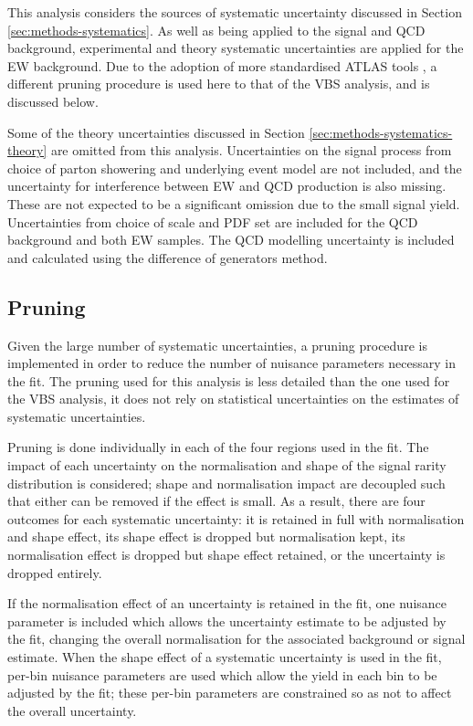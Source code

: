 
This analysis considers the sources of systematic uncertainty discussed in
Section \ref{sec:methods-systematics}. As well as being applied to the signal
and \ac{QCD} \Zy background, experimental and theory systematic
uncertainties are applied for the \ac{EW} \Zyjj background. Due to the adoption
of more standardised \ac{ATLAS} tools \cite{trexfitter}, a different pruning
procedure is used here to that of the \ac{VBS} analysis, and is discussed below.

Some of the theory uncertainties discussed in Section
\ref{sec:methods-systematics-theory} are omitted from this analysis.
Uncertainties on the signal process from choice of parton showering and
underlying event model are not included, and the uncertainty for interference
between \ac{EW} and \ac{QCD} \Zyjj production is also missing. These are not
expected to be a significant omission due to the small signal yield.
Uncertainties from choice of scale and \ac{PDF} set are included for the \ac{QCD}
\Zy background and both \ac{EW} \Zyjj samples. The QCD modelling uncertainty is
included and calculated using the difference of generators method.


\subsection{Pruning}
Given the large number of systematic uncertainties, a pruning procedure is
implemented in order to reduce the number of nuisance parameters necessary in
the fit. The pruning used for this analysis is less detailed than the one used
for the \ac{VBS} \Zy analysis, it does not rely on statistical uncertainties on
the estimates of systematic uncertainties.

Pruning is done individually in each of the four regions used in the fit.
The impact of each uncertainty on the normalisation and shape of the signal
rarity distribution is considered; shape and normalisation impact are decoupled
such that either can be removed if the effect is small. As a result, there are
four outcomes for each systematic uncertainty: it is retained in full with
normalisation and shape effect, its shape effect is dropped but normalisation
kept, its normalisation effect is dropped but shape effect retained, or the
uncertainty is dropped entirely.

If the normalisation effect of an uncertainty is retained in the fit, one
nuisance parameter is included which allows the uncertainty estimate to be
adjusted by the fit, changing the overall normalisation for the associated
background or signal estimate. When the shape effect of a systematic uncertainty
is used in the fit, per-bin nuisance parameters are used which allow the yield
in each bin to be adjusted by the fit; these per-bin parameters are constrained
so as not to affect the overall uncertainty.

